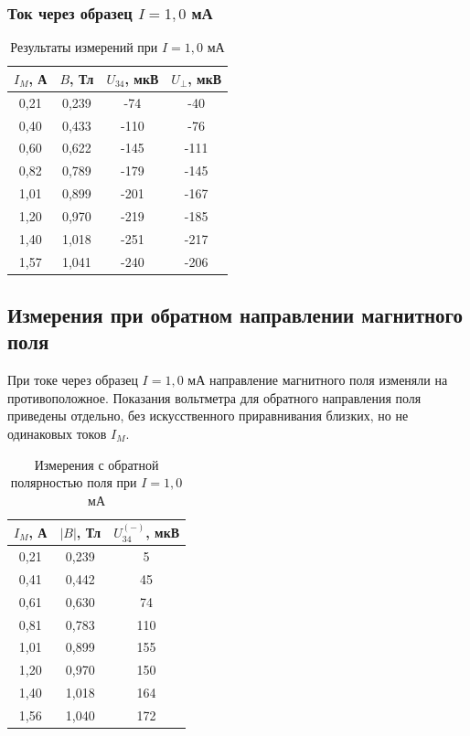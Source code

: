 \documentclass[12pt,a4paper]{article}
\begin{document}
\subsubsection*{Ток через образец $I=1{,}0$ мА}
\begin{table}[H]
\centering
\caption{Результаты измерений при $I=1{,}0$ мА}
\label{tab:hall10}
\begin{tabular}{@{}cccc@{}}
\toprule
$I_M$, А & $B$, Тл & $U_{34}$, мкВ & $U_\perp$, мкВ \\
\midrule
0{,}21 & 0{,}239 & -74 & -40 \\
0{,}40 & 0{,}433 & -110 & -76 \\
0{,}60 & 0{,}622 & -145 & -111 \\
0{,}82 & 0{,}789 & -179 & -145 \\
1{,}01 & 0{,}899 & -201 & -167 \\
1{,}20 & 0{,}970 & -219 & -185 \\
1{,}40 & 1{,}018 & -251 & -217 \\
1{,}57 & 1{,}041 & -240 & -206 \\
\bottomrule
\end{tabular}
\end{table}

\subsection{Измерения при обратном направлении магнитного поля}
При токе через образец $I=1{,}0$ мА направление магнитного поля
изменяли на противоположное. Показания вольтметра для обратного
направления поля приведены отдельно, без искусственного
приравнивания близких, но не одинаковых токов $I_M$.

\begin{table}[H]
\centering
\caption{Измерения с обратной полярностью поля при $I=1{,}0$ мА}
\label{tab:reverse}
\begin{tabular}{@{}ccc@{}}
\toprule
$I_M$, А & $|B|$, Тл & $U_{34}^{(-)}$, мкВ \\
\midrule
0{,}21 & 0{,}239 & 5 \\
0{,}41 & 0{,}442 & 45 \\
0{,}61 & 0{,}630 & 74 \\
0{,}81 & 0{,}783 & 110 \\
1{,}01 & 0{,}899 & 155 \\
1{,}20 & 0{,}970 & 150 \\
1{,}40 & 1{,}018 & 164 \\
1{,}56 & 1{,}040 & 172 \\
\bottomrule
\end{tabular}
\end{table}
\end{document}
